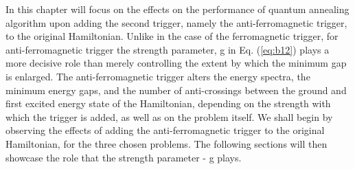\documentclass[../main.tex]{subfiles}
\begin{document}
In this chapter will focus on the effects on the performance of quantum annealing algorithm upon adding the second trigger, namely the anti-ferromagnetic trigger, to the original Hamiltonian. Unlike in the case of the ferromagnetic trigger, for anti-ferromagnetic trigger the strength parameter, g in Eq. (\ref{eq:b12}) plays a more decisive role than merely controlling the extent by which the minimum gap is enlarged. The anti-ferromagnetic trigger alters the energy spectra, the minimum energy gaps, and the number of anti-crossings between the ground and first excited energy state of the Hamiltonian, depending on the strength with which the trigger is added, as well as on the problem itself. We shall begin by observing the effects of adding the anti-ferromagnetic trigger to the original Hamiltonian, for the three chosen problems. The following sections will then showcase the role that the strength parameter - g plays.
\end{document}
